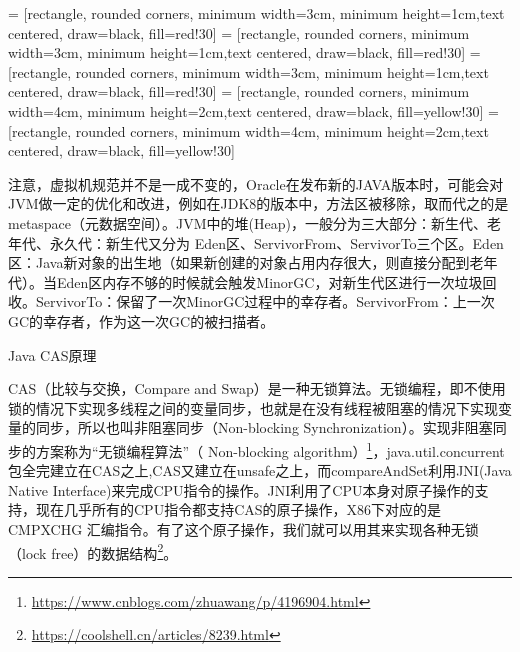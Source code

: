\documentclass[8pt]{book}
\makeatletter
\numberwithin{dummy}{section}
\theoremstyle{ocrenumbox}
\theoremstyle{blacknumex}
\theoremstyle{blacknumbox}
\theoremstyle{ocrenum}
\renewcommand\paragraph{\@startsection{paragraph}{4}{\z@}
	{-2ex \@plus-.2ex \@minus .2ex}
	{.1ex}
	{\normalfont\small\sffamily\bfseries}}
\makeatother
\begin{document}
 = [rectangle, rounded corners, minimum width=3cm, minimum height=1cm,text centered, draw=black, fill=red!30]
 = [rectangle, rounded corners, minimum width=3cm, minimum height=1cm,text centered, draw=black, fill=red!30]
 = [rectangle, rounded corners, minimum width=3cm, minimum height=1cm,text centered, draw=black, fill=red!30]
 = [rectangle, rounded corners, minimum width=4cm, minimum height=2cm,text centered, draw=black, fill=yellow!30]
 = [rectangle, rounded corners, minimum width=4cm, minimum height=2cm,text centered, draw=black, fill=yellow!30]

注意，虚拟机规范并不是一成不变的，Oracle在发布新的JAVA版本时，可能会对JVM做一定的优化和改进，例如在JDK8的版本中，方法区被移除，取而代之的是metaspace（元数据空间）。JVM中的堆(Heap)，一般分为三大部分：新生代、老年代、永久代：新生代又分为 Eden区、ServivorFrom、ServivorTo三个区。Eden区：Java新对象的出生地（如果新创建的对象占用内存很大，则直接分配到老年代）。当Eden区内存不够的时候就会触发MinorGC，对新生代区进行一次垃圾回收。ServivorTo：保留了一次MinorGC过程中的幸存者。ServivorFrom：上一次GC的幸存者，作为这一次GC的被扫描者。


\paragraph{Java CAS原理}

CAS（比较与交换，Compare and Swap）是一种无锁算法。无锁编程，即不使用锁的情况下实现多线程之间的变量同步，也就是在没有线程被阻塞的情况下实现变量的同步，所以也叫非阻塞同步（Non-blocking Synchronization）。实现非阻塞同步的方案称为“无锁编程算法”（ Non-blocking algorithm）\footnote{\url{https://www.cnblogs.com/zhuawang/p/4196904.html}}，java.util.concurrent包全完建立在CAS之上,CAS又建立在unsafe之上，而compareAndSet利用JNI(Java Native Interface)来完成CPU指令的操作。JNI利用了CPU本身对原子操作的支持，现在几乎所有的CPU指令都支持CAS的原子操作，X86下对应的是 CMPXCHG 汇编指令。有了这个原子操作，我们就可以用其来实现各种无锁（lock free）的数据结构\footnote{\url{https://coolshell.cn/articles/8239.html}}。
\end{document}
